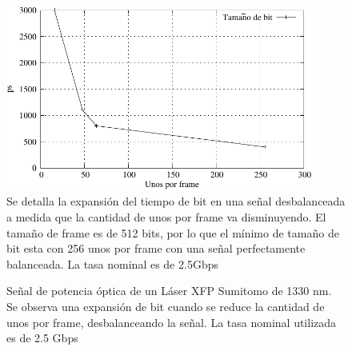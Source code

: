 \begin{figure}[t]
  \centering
    \includegraphics[width=4in]{graphs/expansionbit.pdf}
\caption {Se detalla la expansión del tiempo de bit en una señal desbalanceada a medida que la cantidad de unos por frame va disminuyendo. El tamaño de frame es de 512 bits, por lo que el mínimo de tamaño de bit esta con 256 unos por frame con una señal perfectamente balanceada. La tasa nominal es de 2.5Gbps}
\label{fig:expansionbit}
\end{figure}

\begin{figure}[!t]
   \centering
   \qquad
   \qquad
  \caption {Señal de potencia óptica de un Láser XFP Sumitomo de 1330 nm. Se observa una expansión de bit cuando se reduce la cantidad de unos por frame, desbalanceando la señal. La tasa nominal utilizada es de 2.5 Gbps}
  \label{fig:ImgExpansion}
\end{figure}

